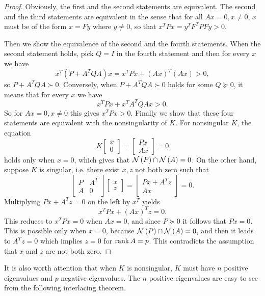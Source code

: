 \documentclass[12pt]{article}
\begin{document}
\begin{proof}
    Obviously, the first and the second statements are equivalent. The second and the third statements are equivalent in the sense that for all \(Ax=0,x\neq 0\), \(x\) must be of the form \(x=Fy\) where \(y\neq 0\), so that \(x^TPx=y^TF^TPFy>0\).\par
    Then we show the equivalence of the second and the fourth statements. When the second statement holds, pick \(Q=I\) in the fourth statement and then for every \(x\) we have
    \[x^T\left(P+A^TQA\right)x=x^TPx+(Ax)^T(Ax)>0,\]
    so \(P+A^TQA\succ 0\). Conversely, when \(P+A^TQA\succ 0\) holds for some \(Q\succeq 0\), it means that for every \(x\) we have
    \[x^TPx+x^TA^TQAx>0.\]
    So for \(Ax=0,x\neq 0\) this gives \(x^TPx>0\). Finally we show that these four statements are equivalent with the nonsingularity of \(K\). For nonsingular \(K\), the equation
    \[K\begin{bmatrix}
        x\\0
    \end{bmatrix}=\begin{bmatrix}
        Px\\Ax
    \end{bmatrix}=0\]
    holds only when \(x=0\), which gives that \(\mathcal N\left(P\right)\cap\mathcal N\left(A\right)=0\). On the other hand, suppose \(K\) is singular, i.e. there exist \(x,z\) not both zero such that
    \[\begin{bmatrix}
        P&A^T\\A&0
    \end{bmatrix}\begin{bmatrix}
        x\\z
    \end{bmatrix}=\begin{bmatrix}
        Px+A^Tz\\Ax
    \end{bmatrix}=0.\]
    Multiplying \(Px+A^Tz=0\) on the left by \(x^T\) yields
    \[x^TPx+(Ax)^Tz=0.\]
    This reduces to \(x^TPx=0\) when \(Ax=0\), and since \(P\succeq 0\) it follows that \(Px=0\). This is possible only when \(x=0\), because \(\mathcal N\left(P\right)\cap\mathcal N\left(A\right)=0\), and then it leads to \(A^Tz=0\) which implies \(z=0\) for \(\operatorname{rank} A=p\). This contradicts the assumption that \(x\) and \(z\) are not both zero.
\end{proof}

It is also worth attention that when \(K\) is nonsingular, \(K\) must have \(n\) positive eigenvalues and \(p\) negative eigenvalues. The \(n\) positive eigenvalues are easy to see from the following interlacing theorem.
\end{document}
